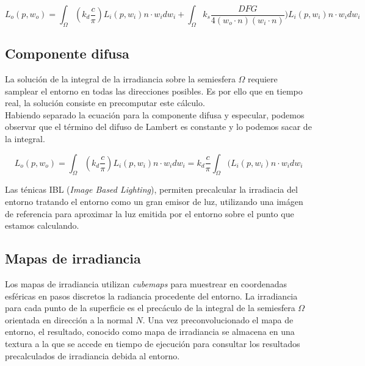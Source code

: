     \begin{equation}
    L_o(p, w_o) = \int_{\Omega}
    (k_d \frac{c}{\pi}) L_i(p, w_i)n\cdot{w_i}dw_i +
    \int_{\Omega} 
    k_s \frac{DFG}{4(w_o\cdot{n})(w_i\cdot{n})})L_i(p, w_i)n\cdot{w_i}dw_i
    \end{equation}
    \singlespacing
    
        \subsection{Componente difusa}
        La soluci\'on de la integral de la irradiancia sobre la semiesfera $\Omega$ requiere samplear el entorno
        en todas las direcciones posibles. Es por ello que en tiempo real, la soluci\'on consiste en
        precomputar este c\'alculo.\\
    
        Habiendo separado la ecuaci\'on para la componente difusa y especular, podemos observar que el t\'ermino del difuso
        de Lambert es constante y lo podemos sacar de la integral.
    
        \begin{equation}
        L_o(p, w_o) = \int_{\Omega}
        (k_d \frac{c}{\pi}) L_i(p, w_i)n\cdot{w_i}dw_i=
        k_d \frac{c}{\pi} \int_{\Omega}
        (L_i(p, w_i)n\cdot{w_i}dw_i
        \end{equation}
        \singlespacing
    
        Las t\'enicas IBL (\textit{Image Based Lighting}), permiten precalcular la irradiacia del entorno tratando el entorno
        como un gran emisor de luz, utilizando una im\'agen de referencia para aproximar la luz emitida por el entorno sobre
        el punto que estamos calculando.\\

            \subsection*{Mapas de irradiancia}
            Los mapas de irradiancia utilizan \textit{cubemaps} para muestrear en coordenadas esf\'ericas en pasos discretos la radiancia
            procedente del entorno. La irradiancia para cada punto de la superficie es el prec\'aculo de la integral de la
            semiesfera $\Omega$ orientada en direcci\'on a la normal $N$. Una vez preconvolucionado el mapa de
            entorno, el resultado, conocido como mapa de irradiancia se almacena en una textura a la que se accede en tiempo
            de ejecuci\'on para consultar los resultados precalculados de irradiancia debida al entorno.

